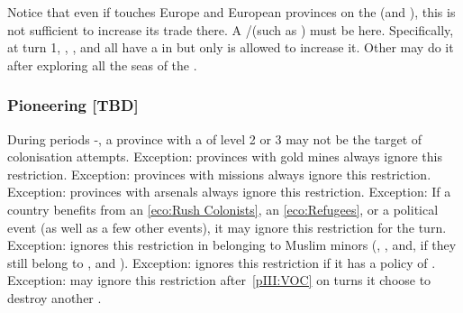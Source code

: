 \begin{exemple}
  Notice that even if  touches Europe and European provinces on
  the \ROTW (\provinceAcores and ), this is not
  sufficient to increase its trade there. A \COL/\TP (such as ) must be here. Specifically, at turn 1, \ANG, \FRA, \HIS and \POR
  all have a \TradeFLEET in  but only \POR is allowed to
  increase it. Other may do it after exploring all the seas of the \STZ.
\end{exemple}


\subsubsection{Pioneering [TBD]}\label{chExpenses:Pioneering}

\aparag During periods -, a province with a \COL of level
2 or 3 may not be the target of colonisation attempts.
\bparag Exception: provinces with gold mines always ignore this restriction.
\bparag Exception: provinces with missions always ignore this restriction.
\bparag Exception: provinces with arsenals always ignore this restriction.
\bparag Exception: If a country benefits from an \ref{eco:Rush Colonists}, an
\ref{eco:Refugees}, or a  political event (as well as
a few other events), it may ignore this restriction for the turn.
\bparag Exception: \TUR ignores this restriction in \Area belonging to Muslim
minors (\granderegionAden, \granderegionOman, \granderegionSoudan and, if they
still belong to \paysGujerat, \granderegionGujarat and \granderegionMalacca).
\bparag Exception: \SUE ignores this restriction if it has a policy of
.
\bparag Exception: \HOL may ignore this restriction after~\ref{pIII:VOC} on
turns it choose to destroy another \COL.


